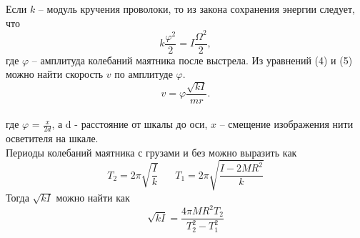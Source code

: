 \documentclass[a4paper, 12pt]{article}%
\begin{document}
	Если $k$ -- модуль кручения проволоки, то из закона сохранения энергии следует, что
	\begin{equation}
		k \frac{\varphi^2}{2} = I \frac{\Omega^2}{2},
	\end{equation}
	где $\varphi$ -- амплитуда колебаний маятника после выстрела.
	Из уравнений (4) и (5) можно найти скорость $v$ по амплитуде $\varphi$.
	\begin{equation}
		v = \varphi \frac{\sqrt{kI}}{mr}.
	\end{equation}\\
    где  $\varphi$ = $\frac{x}{2d}$, а d - расстояние от шкалы до оси,  $x$ -- смещение изображения нити осветителя на шкале.\\
    
    Периоды колебаний маятника с грузами и без можно выразить как
    $$T_2 = 2 \pi \sqrt{\frac{I}{k}} \;\;\;\;\;\; T_1= 2 \pi \sqrt{\frac{I - 2MR^2}{k}}$$
    Тогда $\sqrt{kI}$ можно найти как 
    	\begin{equation}
    		\sqrt{kI} = \frac{4 \pi M R^2 T_2}{T_2^2 - T_1^2}
    	\end{equation}
    
    	\begin{figure}[h]
    \end{figure}
	\\
	
\end{document}
